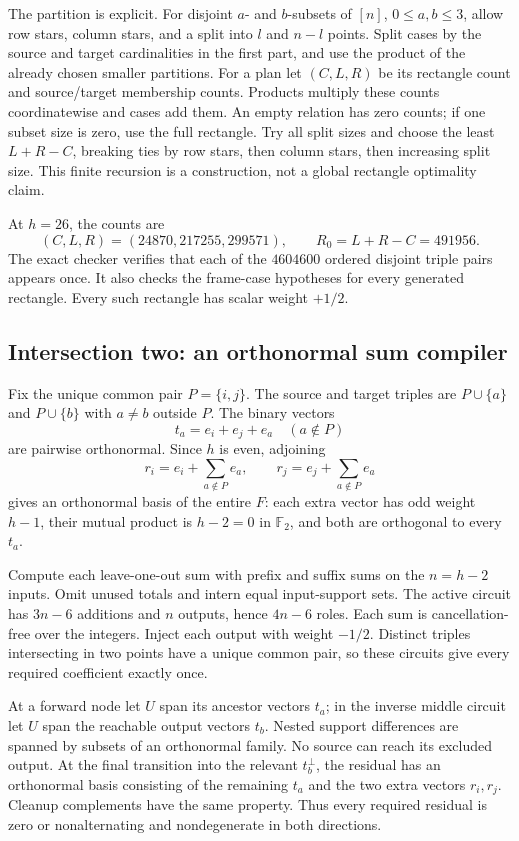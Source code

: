 The partition is explicit. For disjoint $a$- and $b$-subsets of $[n]$,
$0\le a,b\le3$, allow row stars, column stars, and a split into $l$ and
$n-l$ points. Split cases by the source and target cardinalities in the
first part, and use the product of the already chosen smaller partitions.
For a plan let $(C,L,R)$ be its rectangle count and source/target membership
counts. Products multiply these counts coordinatewise and cases add them.
An empty relation has zero counts; if one subset size is zero, use the full
rectangle. Try all split sizes and choose the least $L+R-C$, breaking ties
by row stars, then column stars, then increasing split size. This finite
recursion is a construction, not a global rectangle optimality claim.

At $h=26$, the counts are
\[
 (C,L,R)=(24870,217255,299571),\qquad R_0=L+R-C=491956.
\]
The exact checker verifies that each of the $4604600$ ordered disjoint
triple pairs appears once. It also checks the frame-case hypotheses for
every generated rectangle. Every such rectangle has scalar weight $+1/2$.

\subsection{Intersection two: an orthonormal sum compiler}
Fix the unique common pair $P=\{i,j\}$. The source and target triples
are $P\cup\{a\}$ and $P\cup\{b\}$ with $a\ne b$ outside $P$.
The binary vectors
\[
 t_a=e_i+e_j+e_a\quad(a\notin P)
\]
are pairwise orthonormal. Since $h$ is even, adjoining
\[
 r_i=e_i+\sum_{a\notin P}e_a,\qquad
 r_j=e_j+\sum_{a\notin P}e_a
\]
gives an orthonormal basis of the entire $F$: each extra vector has odd
weight $h-1$, their mutual product is $h-2=0$ in $\mathbb F_2$, and both
are orthogonal to every $t_a$.

Compute each leave-one-out sum with prefix and suffix sums on the $n=h-2$
inputs. Omit unused totals and intern equal input-support sets. The active
circuit has $3n-6$ additions and $n$ outputs, hence $4n-6$ roles. Each sum
is cancellation-free over the integers. Inject each output with weight
$-1/2$. Distinct triples intersecting in two points have a unique common
pair, so these circuits give every required coefficient exactly once.

At a forward node let $U$ span its ancestor vectors $t_a$; in the inverse
middle circuit let $U$ span the reachable output vectors $t_b$. Nested
support differences are spanned by subsets of an orthonormal family.
No source can reach its excluded output. At the final transition into
the relevant $t_b^\perp$, the residual has an orthonormal basis consisting
of the remaining $t_a$ and the two extra vectors $r_i,r_j$. Cleanup
complements have the same property. Thus every required residual is
zero or nonalternating and nondegenerate in both directions.

